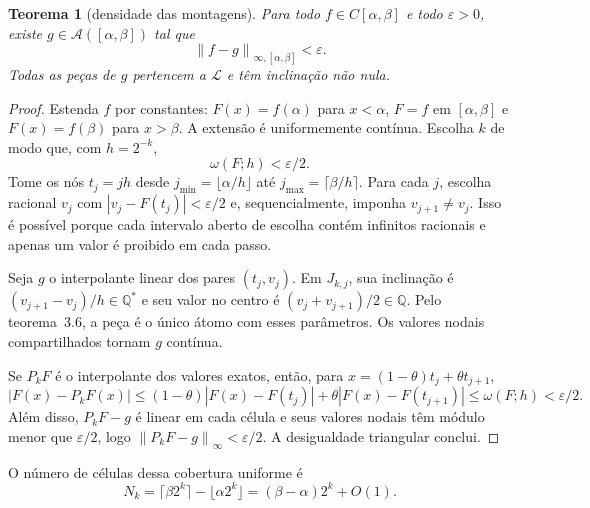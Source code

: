 \documentclass[11pt,a4paper]{article}
\theoremstyle{preciso}
\newtheorem{teorema}{Teorema}[section]
\theoremstyle{definition}
\newcommand{\Q}{\mathbb Q}
\newcommand{\LL}{\mathcal L}
\newcommand{\Asm}{\mathcal A}
\newcommand{\norm}[1]{\left\|#1\right\|_{\infty}}
\newcommand{\normK}[2]{\left\|#1\right\|_{\infty,#2}}
\newcommand{\eqn}[2]{\begin{equation}\label{eq:#1}#2\end{equation}}
\begin{document}
\begin{teorema}[densidade das montagens]
Para todo $f\in C[\alpha,\beta]$ e todo $\varepsilon>0$, existe $g\in\Asm([\alpha,\beta])$ tal que
\[
\normK{f-g}{[\alpha,\beta]}<\varepsilon.
\]
Todas as peças de $g$ pertencem a $\LL$ e têm inclinação não nula.
\end{teorema}
\begin{proof}
Estenda $f$ por constantes: $F(x)=f(\alpha)$ para $x<\alpha$, $F=f$ em $[\alpha,\beta]$ e $F(x)=f(\beta)$ para $x>\beta$. A extensão é uniformemente contínua. Escolha $k$ de modo que, com $h=2^{-k}$,
\eqn{22}{\omega(F;h)<\varepsilon/2.}
Tome os nós $t_j=jh$ desde $j_{\min}=\lfloor\alpha/h\rfloor$ até $j_{\max}=\lceil\beta/h\rceil$. Para cada $j$, escolha racional $v_j$ com $|v_j-F(t_j)|<\varepsilon/2$ e, sequencialmente, imponha $v_{j+1}\ne v_j$. Isso é possível porque cada intervalo aberto de escolha contém infinitos racionais e apenas um valor é proibido em cada passo.

Seja $g$ o interpolante linear dos pares $(t_j,v_j)$. Em $J_{k,j}$, sua inclinação é $(v_{j+1}-v_j)/h\in\Q^*$ e seu valor no centro é $(v_j+v_{j+1})/2\in\Q$. Pelo teorema~3.6, a peça é o único átomo com esses parâmetros. Os valores nodais compartilhados tornam $g$ contínua.

Se $P_kF$ é o interpolante dos valores exatos, então, para $x=(1-\theta)t_j+\theta t_{j+1}$,
\[
|F(x)-P_kF(x)|\le(1-\theta)|F(x)-F(t_j)|+\theta|F(x)-F(t_{j+1})|
\le\omega(F;h)<\varepsilon/2.
\]
Além disso, $P_kF-g$ é linear em cada célula e seus valores nodais têm módulo menor que $\varepsilon/2$, logo $\norm{P_kF-g}<\varepsilon/2$. A desigualdade triangular conclui.
\end{proof}
O número de células dessa cobertura uniforme é
\eqn{23}{N_k=\lceil\beta2^k\rceil-\lfloor\alpha2^k\rfloor=(\beta-\alpha)2^k+O(1).}
\end{document}
